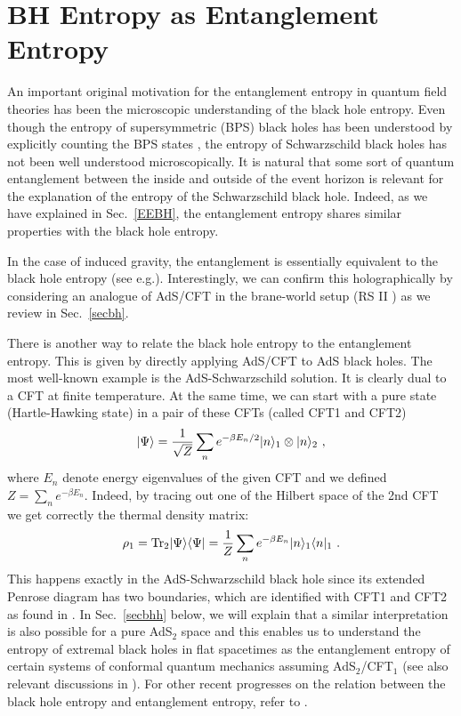\documentclass[12pt]{article}
\def\frac#1#2{{#1\over #2}}
\def\s{\sqrt}
\def\f {\frac}
\def\la{\langle}
\def\lb{\rangle}
\def\frac#1#2{{#1\over #2}}
\def\s{\sqrt}
\def\be{\begin{equation}}
\def\ee{\end{equation}}
\begin{document}
\section{BH Entropy as Entanglement Entropy}
\setcounter{equation}{0}
\label{bfrs}
\hspace{5mm}
An important original motivation for the entanglement entropy
in quantum field theories has been the
microscopic understanding of the black hole entropy. Even though
the entropy of supersymmetric (BPS) black holes has been understood by
explicitly counting the BPS states \cite{StVa}, the entropy of Schwarzschild black holes
has not been well understood microscopically. It is natural that
some sort of quantum entanglement
between
the inside and outside of the event horizon is relevant for the explanation of the entropy of
the Schwarzschild black hole. Indeed, as we have explained in Sec.\ \ref{EEBH},
the entanglement entropy shares
similar properties with the black hole entropy.

In the case of
induced gravity, the entanglement is essentially equivalent to
the black hole entropy
(see e.g.\cite{Jacobson:1994iw}). Interestingly, we can confirm this holographically by
 considering an analogue of AdS/CFT in the brane-world setup (RS II \cite{RS}) \cite{HMS,Emparan:2006ni,Iwashita:2006zj,Solodukhin:2006xv} as we review in Sec.\ \ref{secbh}.

There is another way to relate the black hole entropy to the entanglement entropy.
This is given by directly applying AdS/CFT
to AdS black holes. The most well-known example
is the AdS-Schwarzschild solution. It is clearly dual to a CFT at finite temperature. At the same time,
we can start with a pure state (Hartle-Hawking state) in a pair of
these CFTs (called CFT1 and CFT2)
\be
|\Psi\lb=\f{1}{\s{Z}}\sum_{n}e^{-\beta E_n/2}|n\lb_1\otimes |n\lb_2\ ,
\ee
where $E_n$ denote energy eigenvalues of the given CFT and we defined $Z=\sum_{n}e^{-\beta E_n}$.
Indeed, by
tracing out one of
the Hilbert space of the 2nd CFT
we get correctly the thermal density matrix:
\be
\rho_1=\mbox{Tr}_2|\Psi\lb \la \Psi|=\f{1}{Z}\sum_n
e^{-\beta E_{n}}
|n\lb_1 \la n|_1\
.
\ee
This happens exactly
in the AdS-Schwarzschild black hole since its extended Penrose diagram
has two boundaries, which are identified with
CFT1 and CFT2
as found in \cite{MBH}.
In Sec.\ \ref{secbhh} below, we will explain that a similar interpretation is also possible for
a pure AdS$_2$ space and this enables us to understand the entropy of extremal black holes in
flat spacetimes as the entanglement entropy of certain systems of conformal quantum mechanics
assuming AdS$_2$/CFT$_1$ \cite{Azeyanagi:2007bj} (see also relevant discussions in \cite{Carroll:2009ma}).
For other recent progresses
on the relation between
the black hole entropy and entanglement entropy, refer to
\cite{BEY,Brustein:2006wp,Cadoni:2007nh,Cadoni:2007vf,Casini:2007dk,Das:2007mj,Das:2008sy}.
\end{document}
